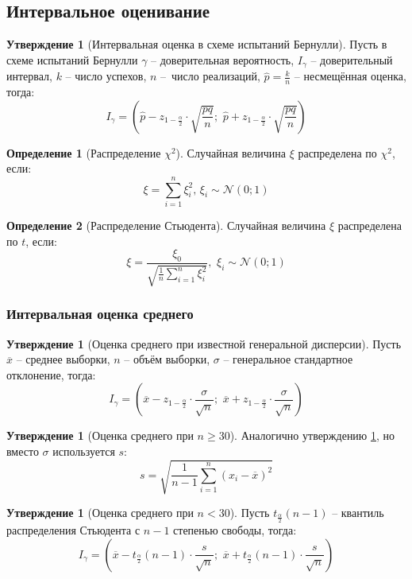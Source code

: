 \documentclass[12pt]{article}
\theoremstyle{definition}
\newtheorem{definition}{Определение}
\newtheorem{statement}[theorem]{Утверждение}
\begin{document}
\subsection{Интервальное оценивание}

\begin{statement}[Интервальная оценка в схеме испытаний Бернулли]
    Пусть в схеме испытаний Бернулли $\gamma$ – доверительная вероятность, $I_\gamma$ – доверительный интервал, $k$ – число успехов, $n$ – число реализаций, $\hat{p}=\frac{k}{n}$ – несмещённая оценка, тогда:
    $$I_\gamma=\left(\hat{p}-z_{1-\frac{\alpha}{2}}\cdot\sqrt{\frac{pq}{n}};\,\,\hat{p}+z_{1-\frac{\alpha}{2}}\cdot\sqrt{\frac{pq}{n}}\right)$$
\end{statement}

\begin{definition}[Распределение $\chi^2$]
    Случайная величина $\xi$ распределена по $\chi^2$, если:
    $$\xi=\sum_{i=1}^{n}\xi_i^2,\,\xi_i\sim\mathcal{N}(0;1)$$
\end{definition}
\begin{definition}[Распределение Стьюдента]
    Случайная величина $\xi$ распределена по $t$, если:
    $$\xi=\dfrac{\xi_0}{\sqrt{\frac{1}{n}\sum\limits_{i=1}^{n}\xi_i^2}},\,\,\xi_i\sim\mathcal{N}(0;1)$$
\end{definition}
\subsubsection{Интервальная оценка среднего}
\begin{statement}[Оценка среднего при известной генеральной дисперсии]\label{Оценка среднего с дисперсией}
    Пусть $\overline{x}$ – среднее выборки, $n$ – объём выборки, $\sigma$ – генеральное стандартное отклонение, тогда:
    $$I_\gamma=\left(\overline{x}-z_{1-\frac{\alpha}{2}}\cdot\frac{\sigma}{\sqrt{n}};\,\,\overline{x}+z_{1-\frac{\alpha}{2}}\cdot\frac{\sigma}{\sqrt{n}}\right)$$
\end{statement}
\begin{statement}[Оценка среднего при $n\geq30$]
    Аналогично утверждению \ref{Оценка среднего с дисперсией}, но вместо $\sigma$ используется $s$:
    $$s=\sqrt{\frac{1}{n-1}\sum_{i=1}^{n}(x_i-\overline{x})^2}$$
\end{statement}
\begin{statement}[Оценка среднего при $n<30$]
    Пусть $t_{\frac{\alpha}{2}}(n-1)$ – квантиль распределения Стьюдента с $n-1$ степенью свободы, тогда:
    $$I_\gamma=\left(\overline{x}-t_{\frac{\alpha}{2}}(n-1)\cdot\frac{s}{\sqrt{n}};\,\,\overline{x}+t_{\frac{\alpha}{2}}(n-1)\cdot\frac{s}{\sqrt{n}}\right)$$
\end{statement}
\end{document}
